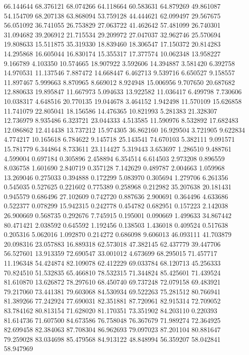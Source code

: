 66.144644
68.376121
68.074266
64.118664
60.583631
64.879269
49.861087
54.154709
68.207138
63.868094
53.759128
44.444621
62.099497
29.567675
56.051092
36.741055
26.753829
27.063722
41.462642
57.481099
26.740301
31.094682
39.206912
21.715534
29.209972
27.047037
32.962746
25.570694
19.808633
15.511875
35.319330
18.839460
18.306547
17.150372
20.814283
14.295868
16.605044
16.830174
15.355317
17.377574
10.062348
13.958227
9.166789
4.103350
10.574665
18.907922
3.592606
14.394887
3.581420
6.392758
14.970531
11.137546
7.887472
14.668447
6.462713
9.539716
6.650527
9.158557
11.897467
5.999663
8.870965
8.669012
8.924948
15.006956
9.707650
20.687682
12.880633
19.895847
11.667973
5.094633
13.922582
11.036417
6.499798
7.730606
10.038317
4.648516
20.770135
19.044678
3.464152
1.942498
11.570109
15.626858
11.741079
22.805041
18.156586
14.476365
10.821993
5.281383
21.328307
12.736979
8.935486
6.323721
23.044333
4.513585
11.590976
8.532892
17.682483
12.086862
12.414438
13.737212
15.974305
36.862160
16.929504
3.721905
9.622834
4.774217
10.165618
6.784622
9.145718
25.143541
74.670103
5.382111
9.091571
15.781779
6.344864
8.733611
23.114427
5.319443
3.653697
1.286510
9.488761
4.599004
0.697184
0.305896
2.458894
6.354514
6.614503
2.973208
0.896559
8.036758
1.601690
2.840719
0.357128
7.142629
0.489787
2.004663
1.059968
13.269046
0.275033
0.394888
0.172299
5.083970
0.305694
1.279706
6.261356
0.545035
0.527625
0.221602
0.775389
0.258968
0.212982
35.207638
20.181431
0.945579
0.686496
27.102609
0.742720
0.887636
2.900691
0.364496
4.633686
0.522377
0.078299
15.942315
0.242778
0.454782
0.682951
0.157223
2.142038
26.900669
0.568735
0.292676
7.745915
0.195001
0.090669
1.499633
34.867442
80.471421
2.038592
0.645592
1.192456
0.138503
1.436018
0.409524
0.517638
0.205316
5.062016
1.092870
0.214272
0.686098
9.606013
46.093111
41.703879
20.098316
23.057883
16.889318
62.573018
47.382145
62.437779
39.447706
56.527601
13.913359
72.690547
33.001012
4.673699
68.295015
71.457717
11.196348
54.424874
82.109078
62.412229
69.033784
68.120713
45.256333
70.824510
51.532835
65.466810
78.532315
71.344824
85.425601
71.439524
81.610870
13.626872
78.297610
68.450740
69.737248
72.079158
69.483921
79.217060
73.441381
79.603068
84.530934
69.522263
75.281512
80.766941
81.389266
77.242924
77.690031
82.351881
87.720961
82.915314
72.709052
83.784162
80.813154
71.628020
81.170351
73.351902
84.203110
0.220393
81.614736
71.607500
84.673586
76.758048
76.367679
71.989274
72.364925
82.699458
82.384063
87.708304
86.962693
79.097023
87.201104
80.881647
79.259028
83.034698
85.479568
84.913122
48.848994
56.359207
58.042841
58.947969
